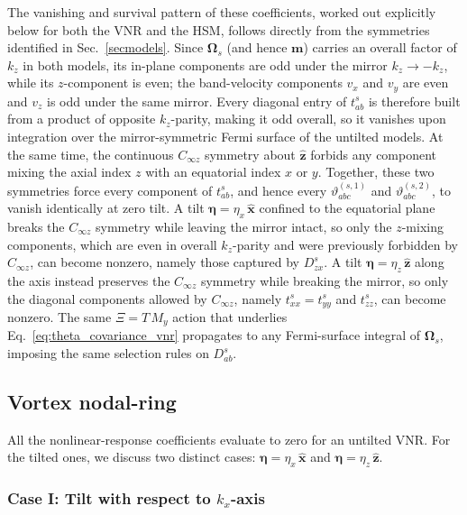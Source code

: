 \documentclass[aps,prb,onecolumn,nofootinbib,citeautoscript,10pt]{revtex4-2}
\newcommand{\bs}[1]{\boldsymbol{#1}}
\begin{document}
The vanishing and survival pattern of these coefficients, worked out
explicitly below for both the VNR and the HSM, follows directly from the
symmetries identified in Sec.~\ref{secmodels}. Since $\bs \Omega_s$ (and hence
$\boldsymbol m$) carries an overall factor of $k_z$ in both models, its
in-plane components are odd under the mirror $k_z \rightarrow -k_z$, while its
$z$-component is even; the band-velocity components $v_x$ and $v_y$ are even
and $v_z$ is odd under the same mirror. Every diagonal entry of
$t^s_{ab}$ is therefore built from a product of opposite $k_z$-parity, making
it odd overall, so it vanishes upon integration over the mirror-symmetric
Fermi surface of the untilted models. At the same time, the continuous
$C_{\infty z}$ symmetry about $\hat{\bs z}$ forbids any component mixing the
axial index $z$ with an equatorial index $x$ or $y$. Together, these two
symmetries force every component of $t^s_{ab}$, and hence every
$\vartheta^{(s,1)}_{abc}$ and $\vartheta^{(s,2)}_{abc}$, to vanish identically
at zero tilt. A tilt $\bs \eta = \eta_x \, \hat{\bs x}$ confined to the equatorial plane
breaks the $C_{\infty z}$ symmetry while leaving the mirror intact, so only
the $z$-mixing components, which are even in overall $k_z$-parity and were
previously forbidden by $C_{\infty z}$, can become nonzero, namely those
captured by $D^s_{zx}$. A tilt $\bs \eta = \eta_z \, \hat{\bs z}$ along the
axis instead preserves the $C_{\infty z}$ symmetry while breaking the mirror,
so only the diagonal components allowed by $C_{\infty z}$, namely
$t^s_{xx}=t^s_{yy}$ and $t^s_{zz}$, can become nonzero.
The same $\Xi = T \,M_y$ action that underlies
Eq.~\eqref{eq:theta_covariance_vnr} propagates to any Fermi-surface integral
of $\bs \Omega_s$, imposing the same selection rules on $D^s_{ab}$.

\subsection{Vortex nodal-ring}

All the nonlinear-response coefficients evaluate to zero for an untilted VNR. For the tilted ones, we discuss two distinct cases: $\bs \eta = \eta_x \,\bs{\hat x} $ and $ \bs \eta = \eta_z \,\bs{\hat z} $.


\subsubsection{Case I: Tilt with respect to $ k_x $-axis}
\end{document}
